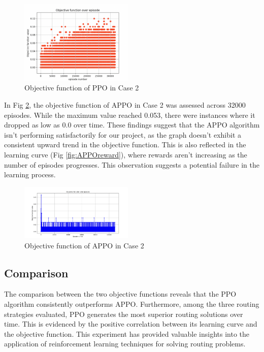 \documentclass[conference]{IEEEtran}
\begin{document}
\begin{figure}[h]
    \includegraphics[width=0.48\textwidth]{case2_PPO_objec_func.png}
    \caption{Objective function of PPO in Case 2}
    \label{fig:PPOcase2}
\end{figure}


In Fig \ref{fig:APPOcase2}, the objective function of APPO in Case 2 was assessed across 32000 episodes. While the maximum value reached 0.053, there were instances where it dropped as low as 0.0 over time. These findings suggest that the APPO algorithm isn't performing satisfactorily for our project, as the graph doesn't exhibit a consistent upward trend in the objective function. This is also reflected in the learning curve (Fig \ref{fig:APPOreward}), where rewards aren't increasing as the number of episodes progresses. This observation suggests a potential failure in the learning process.


\begin{figure}[h]
    \includegraphics[width=0.48\textwidth]{case2_APPO_objec_func.png}
    \caption{Objective function of APPO in Case 2}
    \label{fig:APPOcase2}
\end{figure}

\subsection{Comparison}
\label{sec:comparison}
The comparison between the two objective functions reveals that the PPO algorithm consistently outperforms APPO. Furthermore, among the three routing strategies evaluated, PPO generates the most superior routing solutions over time. This is evidenced by the positive correlation between its learning curve and the objective function. This experiment has provided valuable insights into the application of reinforcement learning techniques for solving routing problems.






\end{document}
